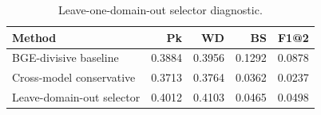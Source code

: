 \begin{table}[t]
\centering
\small
\caption{Leave-one-domain-out selector diagnostic.}
\label{tab:selector_leave_domain_out}
\begin{tabular}{lrrrr}
\toprule
Method & Pk & WD & BS & F1@2 \\
\midrule
BGE-divisive baseline & 0.3884 & 0.3956 & 0.1292 & 0.0878 \\
Cross-model conservative & 0.3713 & 0.3764 & 0.0362 & 0.0237 \\
Leave-domain-out selector & 0.4012 & 0.4103 & 0.0465 & 0.0498 \\
\bottomrule
\end{tabular}
\end{table}